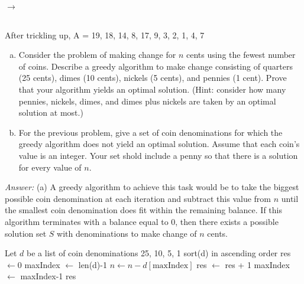 \documentclass[12pt]{article}
\newenvironment{problem}[2][Problem]{\begin{trivlist}
\item[\hskip \labelsep {\bfseries #1}\hskip \labelsep {\bfseries #2.}]}{\end{trivlist}}
\begin{document}
$\rightarrow$
\\After trickling up, A = 19, 18, 14, 8, 17, 9, 3, 2, 1, 4, 7
\begin{problem}{3} \hfill
\begin{enumerate}[(a)]
	\item Consider the problem of making change for $n$ cents using the fewest number of coins. Describe a greedy algorithm to make change consisting of quarters (25 cents), dimes (10 cents), nickels (5 cents), and pennies (1 cent). Prove that your algorithm yields an optimal solution. (Hint: consider how many pennies, nickels, dimes, and dimes plus nickels are taken by an optimal solution at most.)
	\item For the previous problem, give a set of coin denominations for which the greedy algorithm does not yield an optimal solution. Assume that each coin's value is an integer. Your set shold include a penny so that there is a solution for every value of $n$.
\end{enumerate}
\end{problem}
\textit{Answer:}
(a) A greedy algorithm to achieve this task would be to take the biggest possible coin denomination at each iteration and subtract this value from $n$ until the smallest coin denomination does fit within the remaining balance. If this algorithm terminates with a balance equal to 0, then there exists a possible solution set $S$ with denominations to make change of $n$ cents.
	
	\begin{algorithmic}
			\State Let $d$ be a list of coin denominations 25, 10, 5, 1
			\State sort(d) in ascending order
			\State res $\gets 0$
			\State maxIndex $\gets$ len(d)-1
					\State $n \gets n-d[\text{maxIndex}]$
					\State res $\gets$ res + 1
				\Else
					\State maxIndex $\gets$ maxIndex-1
					\EndIf
				\EndIf
			\EndWhile
			 \Return res
			\Else\hspace{.5mm}  
			\EndIf
		\EndProcedure
	\end{algorithmic}
	
\end{document}
